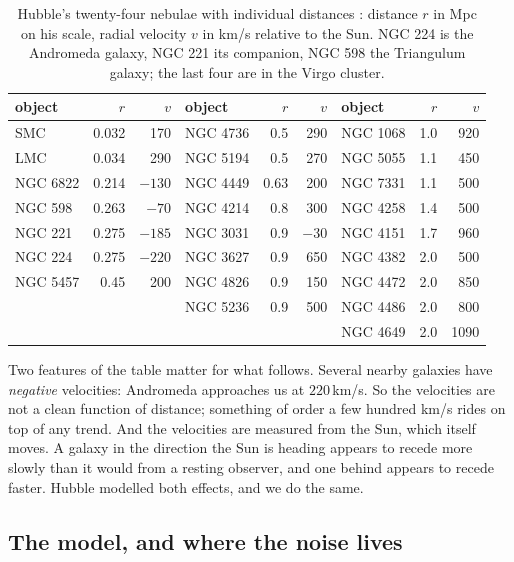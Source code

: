 \begin{table}[htbp]
\centering
\small
\begin{tabular}{@{}lrr@{\hspace{2.2em}}lrr@{\hspace{2.2em}}lrr@{}}
\toprule
object & $r$ & $v$ & object & $r$ & $v$ & object & $r$ & $v$\\
\midrule
SMC      & 0.032 &  170 & NGC 4736 & 0.5  &  290 & NGC 1068 & 1.0 &  920\\
LMC      & 0.034 &  290 & NGC 5194 & 0.5  &  270 & NGC 5055 & 1.1 &  450\\
NGC 6822 & 0.214 & $-130$ & NGC 4449 & 0.63 & 200 & NGC 7331 & 1.1 &  500\\
NGC 598  & 0.263 & $-70$  & NGC 4214 & 0.8  & 300 & NGC 4258 & 1.4 &  500\\
NGC 221  & 0.275 & $-185$ & NGC 3031 & 0.9  & $-30$ & NGC 4151 & 1.7 &  960\\
NGC 224  & 0.275 & $-220$ & NGC 3627 & 0.9  & 650 & NGC 4382 & 2.0 &  500\\
NGC 5457 & 0.45  &  200 & NGC 4826 & 0.9  &  150 & NGC 4472 & 2.0 &  850\\
         &       &      & NGC 5236 & 0.9  &  500 & NGC 4486 & 2.0 &  800\\
         &       &      &          &      &      & NGC 4649 & 2.0 & 1090\\
\bottomrule
\end{tabular}
\caption{Hubble's twenty-four nebulae with individual distances
\cite[Table~1]{Hubble1929}: distance $r$ in Mpc on his scale, radial velocity $v$ in
km/s relative to the Sun. NGC 224 is the Andromeda galaxy, NGC 221 its companion, NGC 598
the Triangulum galaxy; the last four are in the Virgo cluster.}
\label{11c:tab:hubble-data}
\end{table}

Two features of the table matter for what follows. Several nearby galaxies have
\emph{negative} velocities: Andromeda approaches us at $220$\,km/s. So the
velocities are not a clean function of distance; something of order a few hundred
km/s rides on top of any trend. And the velocities are measured from the Sun,
which itself moves. A galaxy in the direction the Sun is heading appears to
recede more slowly than it would from a resting observer, and one behind appears
to recede faster. Hubble modelled both effects, and we do the same.

\subsection{The model, and where the noise lives}
\label{11c:sec:hubble-model}

